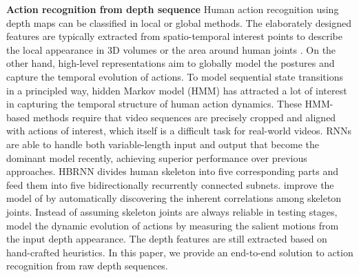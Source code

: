 \documentclass[10pt,twocolumn,letterpaper]{article}
\begin{document}
\noindent \textbf{Action recognition from depth sequence} Human action recognition using depth maps can be classified in local or global methods. The elaborately designed features \cite{Wanqing_cvprw_2010,Jiang_tpami_2014,Omar_cvpr_2013} are typically extracted from spatio-temporal interest points to describe the local appearance in 3D volumes or the area around human joints \cite{Gowayyed_IJCAI_2013}. On the other hand, high-level representations \cite{Xiaodong_2014_cvpr} aim to globally model the postures and capture the temporal evolution of actions. To model sequential state transitions in a principled way, hidden Markov model (HMM) has attracted a lot of interest \cite{gong_tpami_2014} in capturing the temporal structure of human action dynamics. These HMM-based methods require that video sequences are precisely cropped and aligned with actions of interest, which itself is a difficult task for real-world videos. RNNs are able to handle both variable-length input and output that become the dominant model \cite{Veeriah_2015_ICCV,Yong_cvpr_2015,wentao_2016} recently, achieving superior performance over previous approaches. HBRNN \cite{Yong_cvpr_2015} divides human skeleton into five corresponding parts and feed them into five bidirectionally recurrently connected subnets. \cite{wentao_2016} improve the model of \cite{Yong_cvpr_2015} by automatically discovering the inherent correlations among skeleton joints. Instead of assuming skeleton joints are always reliable in testing stages, \cite{Veeriah_2015_ICCV} model the dynamic evolution of actions by measuring the salient motions from the input depth appearance. The depth features are still extracted based on hand-crafted heuristics. In this paper, we provide an end-to-end solution to action recognition from raw depth sequences.  
 
\end{document}
